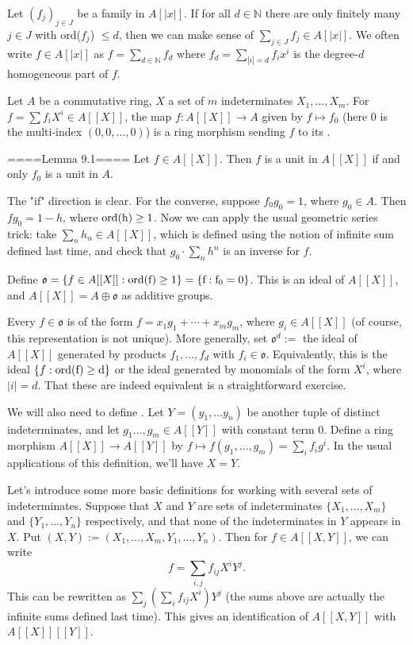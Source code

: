 Let $(f_j)_{j \in J}$ be a family in $A[|x|]$. If for all $d \in \mathbb{N}$ there are only finitely many $j \in J$ with ord($f_j$) $\leq d$, then we can make sense of $\sum_{j \in J}f_j \in A[|x|]$. We often write $f \in A[|x|]$ as $f=\sum_{d \in \mathbb{N}} f_d$ where $f_d=\sum_{|i|=d}f_i x^i$ is the degree-$d$ homogeneous part of $f$.

Let $A$ be a commutative ring, $X$ a set of $m$ indeterminates $X_1,\ldots,X_m$. For $f=\sum f_i X^i \in A[[X]]$, the map $f: A[[X]]\rightarrow A$ given by $f\mapsto f_0$ (here $0$ is the multi-index $(0,0,\ldots,0)$) is a ring morphism sending $f$ to its . 

====Lemma 9.1====
Let $f\in A[[X]]$. Then $f$ is a unit in $A[[X]]$ if and only $f_0$ is a unit in $A$.


The "if" direction is clear. For the converse, suppose $f_0g_0=1$, where $g_0\in A$. Then $fg_0=1-h$, where $\rm{ord}(h)\ge 1$. Now we can apply the usual geometric series trick: take $\sum_n h_n\in A[[X]]$, which is defined using the notion of infinite sum defined last time, and check that $g_0\cdot \sum_n h^n$ is an inverse for $f$. 


Define $\mathfrak{o}=\{f\in A[[X]]:\rm{ord}(f)\ge 1\}=\{f:f_0=0\}$. This is an ideal of $A[[X]]$, and $A[[X]]=A\oplus \mathfrak{o}$ as additive groups. 

Every $f\in \mathfrak{o}$ is of the form $f=x_1g_1+\cdots +x_mg_m$, where $g_i\in A[[X]]$ (of course, this representation is not unique). More generally, set $\mathfrak{o}^d:=$ the ideal of $A[[X]]$ generated by products $f_1,\ldots,f_d$ with $f_i\in \mathfrak{o}$. Equivalently, this is the ideal $\{f:\rm{ord}(f)\ge d\}$ or the ideal generated by monomials of the form $X^i$, where $|i|=d$. That these are indeed equivalent is a straightforward exercise.

We will also need to define . Let $Y=(y_1,\ldots y_n)$ be another tuple of distinct indeterminates, and let $g_1\ldots, g_m\in A[[Y]]$ with constant term $0$. Define a ring morphism $A[[X]]\rightarrow A[[Y]]$ by $f\mapsto f(g_1,\ldots, g_m)=\sum_i f_i g^i$. In the usual applications of this definition, we'll have $X=Y$.

Let's introduce some more basic definitions for working with several sets of indeterminates. Suppose that $X$ and $Y$ are sets of indeterminates $\{X_1,\ldots,X_m\}$ and $\{Y_1,\ldots,Y_n\}$ respectively, and that none of the indeterminates in $Y$ appears in $X$. Put $(X,Y):=(X_1,\ldots, X_m, Y_1,\ldots, Y_n)$. Then for $f\in A[[X,Y]]$, we can write 
$$f= \sum_{i,j} f_{ij} X^iY^j.$$
This can be rewritten as $\sum_j(\sum_i f_{ij}X^i)Y^j$ (the sums above are actually the infinite sums defined last time). This gives an identification of $A[[X,Y]]$ with $A[[X]][[Y]]$.

